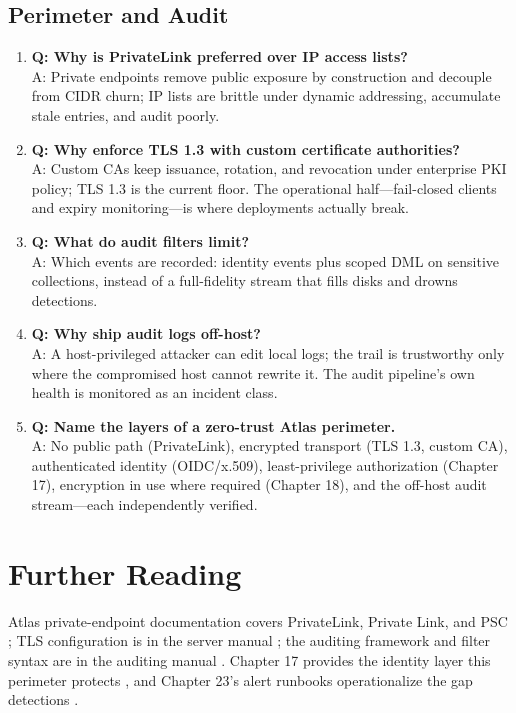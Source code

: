\subsection{Perimeter and Audit}
\begin{enumerate}
    \item \textbf{Q: Why is PrivateLink preferred over IP access lists?}\\
    A: Private endpoints remove public exposure by construction and decouple from CIDR churn; IP lists are brittle under dynamic addressing, accumulate stale entries, and audit poorly.

    \item \textbf{Q: Why enforce TLS 1.3 with custom certificate authorities?}\\
    A: Custom CAs keep issuance, rotation, and revocation under enterprise PKI policy; TLS 1.3 is the current floor. The operational half---fail-closed clients and expiry monitoring---is where deployments actually break.

    \item \textbf{Q: What do audit filters limit?}\\
    A: Which events are recorded: identity events plus scoped DML on sensitive collections, instead of a full-fidelity stream that fills disks and drowns detections.

    \item \textbf{Q: Why ship audit logs off-host?}\\
    A: A host-privileged attacker can edit local logs; the trail is trustworthy only where the compromised host cannot rewrite it. The audit pipeline's own health is monitored as an incident class.

    \item \textbf{Q: Name the layers of a zero-trust Atlas perimeter.}\\
    A: No public path (PrivateLink), encrypted transport (TLS 1.3, custom CA), authenticated identity (OIDC/x.509), least-privilege authorization (Chapter 17), encryption in use where required (Chapter 18), and the off-host audit stream---each independently verified.
\end{enumerate}

\section{Further Reading}
Atlas private-endpoint documentation covers PrivateLink, Private Link, and PSC \cite{mongodbPrivateLinkDocs}; TLS configuration is in the server manual \cite{mongodbTLSDocs}; the auditing framework and filter syntax are in the auditing manual \cite{mongodbAuditingDocs}. Chapter 17 provides the identity layer this perimeter protects \cite{mongodbSecurityChecklistDocs,mongodbRBACDocs}, and Chapter 23's alert runbooks operationalize the gap detections \cite{mongodbAtlasMonitoringDocs}.

